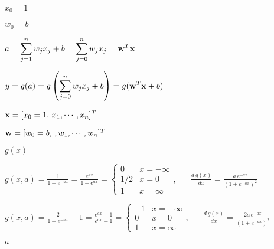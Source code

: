 \documentclass{article}
\def\lthtmlcheckvsize{\ifdim\ht\sizebox<\vsize 
  \ifdim\wd\sizebox<\hsize\expandafter\hfill\fi \expandafter\vfill
  \else\expandafter\vss\fi}%
\begin{document}
{\newpage\clearpage
{}%
$ x_0=1$%
\lthtmlindisplaymathZ
\lthtmlcheckvsize\clearpage}

{\newpage\clearpage
{}%
$ w_0=b$%
\lthtmlindisplaymathZ
\lthtmlcheckvsize\clearpage}

{\newpage\clearpage
{}%
$\displaystyle a=\sum_{j=1}^n w_j x_j+b=\sum_{j=0}^n w_j x_j={\bf w}^T{\bf x}$%
\lthtmlindisplaymathZ
\lthtmlcheckvsize\clearpage}

{\newpage\clearpage
{}%
$\displaystyle y=g(a)=g\left(\sum_{j=0}^n w_j x_j+b\right)=g({\bf w}^T{\bf x}+b)$%
\lthtmlindisplaymathZ
\lthtmlcheckvsize\clearpage}

{\newpage\clearpage
{}%
$ {\bf x}=[x_0=1,\,x_1,\cdots,x_n]^T$%
\lthtmlindisplaymathZ
\lthtmlcheckvsize\clearpage}

{\newpage\clearpage
{}%
$ {\bf w}=[w_0=b,\,,w_1,\cdots,w_n]^T$%
\lthtmlindisplaymathZ
\lthtmlcheckvsize\clearpage}

{\newpage\clearpage
{}%
$ g(x)$%
\lthtmlindisplaymathZ
\lthtmlcheckvsize\clearpage}

{\newpage\clearpage
{}%
$\displaystyle g(x,a)=\frac{1}{1+e^{-ax}}=\frac{e^{ax}}{1+e^{ax}}=\left\{\begin{array}{rl}
0 & x=-\infty \\1/2 & x=0 \\1 & x=\infty\end{array}\right.,
\;\;\;\;\;\;
\frac{d\,g(x)}{dx}=\frac{a\,e^{-ax}}{(1+e^{-ax})^2}$%
\lthtmlindisplaymathZ
\lthtmlcheckvsize\clearpage}

{\newpage\clearpage
{}%
$\displaystyle g(x,a)=\frac{2}{1+e^{-ax}}-1=\frac{e^{ax}-1}{e^{ax}+1}
=\left\{\begin{array}{rl}-1 & x=-\infty \\0 & x=0 \\1 & x=\infty
\end{array}\right.,
\;\;\;\;\;\;
\frac{d\,g(x)}{dx}=\frac{2a\,e^{-ax}}{(1+e^{-ax})^2}$%
\lthtmlindisplaymathZ
\lthtmlcheckvsize\clearpage}

{\newpage\clearpage
{}%
$ a$%
\lthtmlindisplaymathZ
\lthtmlcheckvsize\clearpage}
\end{document}
